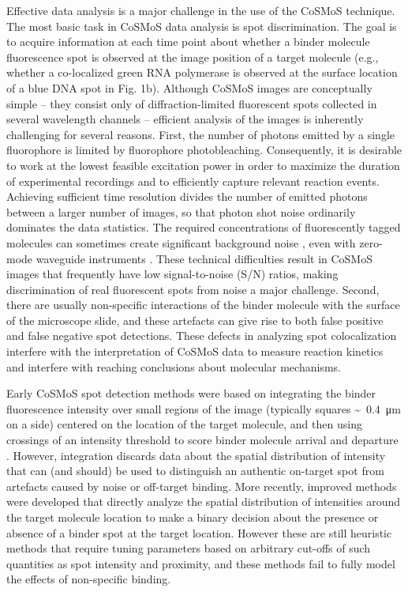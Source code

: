 Effective data analysis is a major challenge in the use of the CoSMoS technique. The most basic task in CoSMoS data analysis is spot discrimination. The goal is to acquire information at each time point about whether a binder molecule fluorescence spot is observed at the image position of a target molecule (e.g., whether a co-localized green RNA polymerase is observed at the surface location of a blue DNA spot in Fig. 1b). Although CoSMoS images are conceptually simple -- they consist only of diffraction-limited fluorescent spots collected in several wavelength channels -- efficient analysis of the images is inherently challenging for several reasons. First, the number of photons emitted by a single fluorophore is limited by fluorophore photobleaching. Consequently, it is desirable to work at the lowest feasible excitation power in order to maximize the duration of experimental recordings and to efficiently capture relevant reaction events. Achieving sufficient time resolution divides the number of emitted photons between a larger number of images, so that photon shot noise ordinarily dominates the data statistics. The required concentrations of fluorescently tagged molecules can sometimes create significant background noise \cite{Peng2018-ge, Van_Oijen2011-ig}, even with zero-mode waveguide instruments \cite{Chen2014-jd}. These technical difficulties result in CoSMoS images that frequently have low signal-to-noise (S/N) ratios, making discrimination of real fluorescent spots from noise a major challenge. Second, there are usually non-specific interactions of the binder molecule with the surface of the microscope slide, and these artefacts can give rise to both false positive and false negative spot detections. These defects in analyzing spot colocalization interfere with the interpretation of CoSMoS data to measure reaction kinetics and interfere with reaching conclusions about molecular mechanisms.

Early CoSMoS spot detection methods were based on integrating the binder fluorescence intensity over small regions of the image (typically squares \SI{0.4}[\sim]{\um} on a side) centered on the location of the target molecule, and then using crossings of an intensity threshold to score binder molecule arrival and departure \cite{Friedman2015-nx}. However, integration discards data about the spatial distribution of intensity that can (and should) be used to distinguish an  authentic on-target spot from artefacts caused by noise or off-target binding.  More recently, improved methods \cite{Friedman2015-nx,Smith2019-yb} were developed that directly analyze the spatial distribution of intensities around the target molecule location to make a binary decision about the presence or absence of a binder spot at the target location.  However these are still heuristic methods that require tuning parameters based on arbitrary cut-offs of such quantities as spot intensity and proximity, and these methods fail to fully model the effects of non-specific binding.

